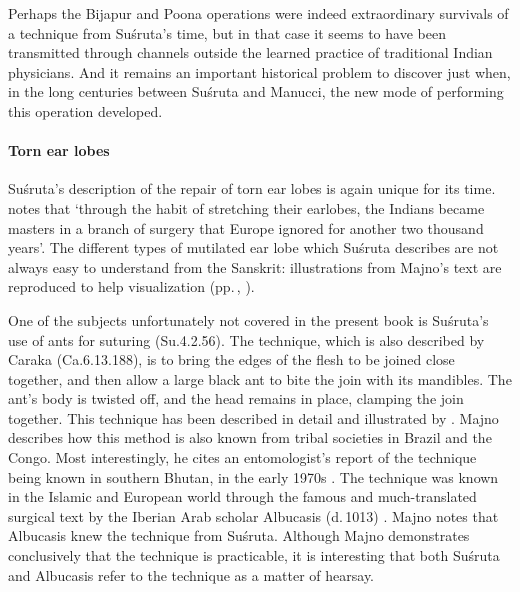 Perhaps the Bijapur and Poona operations were indeed
extraordinary survivals of a technique from Suśruta's time, but in
that case it seems to have been transmitted through channels
outside the learned practice of traditional Indian physicians.
And it remains an important historical problem to discover just
when, in the long centuries between Suśruta and Manucci, the new
mode of performing this operation developed.


\paragraph{Torn ear lobes}
Suśruta's description of the repair of torn ear lobes is again unique for
its time.  \citet[291]{majn-heal} notes that `through the habit of
stretching their earlobes, the Indians became masters in a branch of surgery
that Europe ignored for another two thousand years'.  The different types of
mutilated ear lobe which Suśruta describes are not always easy to understand
from the Sanskrit: illustrations from Majno's text are reproduced to help
visualization (pp.\,\pageref{fig:earlobes}, \pageref{fig:gandakarna}).

One of the subjects unfortunately not covered in the present book is
Suśruta's use of ants for suturing (Su.4.2.56).  The technique, which is
also described by Caraka (Ca.6.13.188), is to bring
the edges of the flesh to be joined close together, and then allow a large
black ant to bite the join with its mandibles.  The ant's body is twisted
off, and the head remains in place, clamping the join together.  This
technique has been described in detail and illustrated by
\citet[304\,ff]{majn-heal}.  Majno describes how this method is also
known from tribal societies in Brazil and the Congo. Most interestingly, he
cites an entomologist's report of the technique being known in southern
Bhutan, in the early 1970s \citep[307, n.\,298]{majn-heal}.  The technique
was known in the Islamic and European world through the famous and
much-translated surgical text by the Iberian Arab scholar Albucasis
(d.\,1013)
\citep[550--51]{spin-albu}.  Majno notes that Albucasis knew the technique
from Suśruta.  Although Majno demonstrates conclusively that the technique
is practicable, it is interesting that both Suśruta and Albucasis refer to
the technique as a matter of hearsay.


